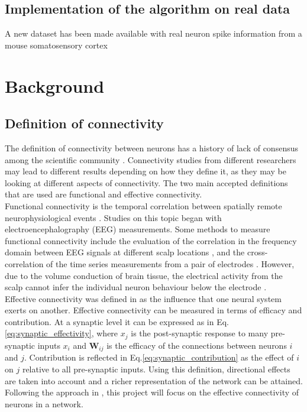 \documentclass[11pt]{article}
\begin{document}
\subsection{Implementation of the algorithm on real data}

A new dataset has been made available \cite{ito2016spontaneous, ito2014large, litke2004does} with real neuron spike information from a mouse somatosensory cortex

\section{Background}

\subsection{Definition of connectivity}

The definition of connectivity between neurons has a history of lack of consensus among the scientific community \cite{HORWITZ2003466}. Connectivity studies from different researchers may lead to different results depending on how they define it, as they may be looking at different aspects of connectivity. The two main accepted definitions that are used are functional and effective connectivity.
\\
Functional connectivity is the temporal correlation between spatially remote neurophysiological events \cite{friston1993functional}. Studies on this topic began with electroencephalography (EEG) measurements. Some methods to measure functional connectivity include the evaluation of the correlation in the frequency domain between EEG signals at different scalp locations \cite{pfurtscheller1999event}, and the cross-correlation of the time series measurements from a pair of electrodes \cite{gevins1985neurocognitive}. However, due to the volume conduction of brain tissue, the electrical activity from the scalp cannot infer the individual neuron behaviour below the electrode \cite{HORWITZ2003466}.
\\
Effective connectivity was defined in \cite{friston1993functional} as the influence that one neural system exerts on another. Effective connectivity can be measured in terms of efficacy and contribution. At a synaptic level it can be expressed as in Eq.\ref{eq:synaptic_effectivity}, where $x_{j}$ is the post-synaptic response to many pre-synaptic inputs $x_{i}$ and $\textbf{W}_{ij}$ is the efficacy of the connections between neurons $i$ and $j$. Contribution is reflected in Eq.\ref{eq:synaptic_contribution} as the effect of $i$ on $j$ relative to all pre-synaptic inputs. Using this definition, directional effects are taken into account and a richer representation of the network can be attained. Following the approach in \cite{alexandru2018estimating}, this project will focus on the effective connectivity of neurons in a network.
\\
\end{document}
